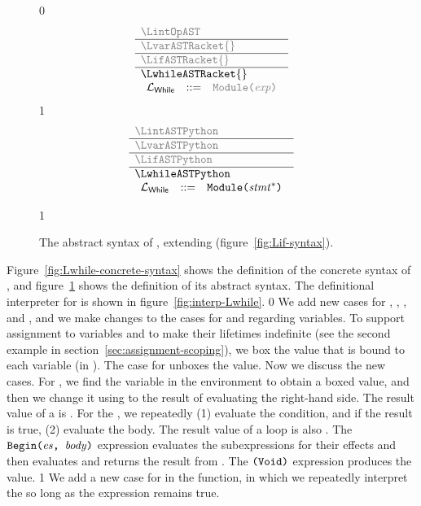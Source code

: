 \documentclass[7x10]{TimesAPriori_MIT}%
\newcommand{\gray}[1]{{\color{gray} #1}}
\def\racketEd{0}
\def\pythonEd{1}
\def\edition{1}
\newcommand{\pythonColor}[0]{}
\newcommand{\python}[1]{{\if\edition\pythonEd\pythonColor #1\fi}}
\numberwithin{theorem}{chapter}
\numberwithin{definition}{chapter}
\numberwithin{equation}{chapter}
\begin{document}
\begin{figure}[tp]
\centering
\begin{tcolorbox}[colback=white]
    \small
{\if\edition\racketEd    
\[
\begin{array}{l}
  \gray{\LintOpAST} \\ \hline
  \gray{\LvarASTRacket{}} \\ \hline
  \gray{\LifASTRacket{}} \\ \hline
  \LwhileASTRacket{} \\
\begin{array}{lcl}
  \LangLoopM{} &::=& \gray{ \PROGRAM{\code{'()}}{\Exp} }
\end{array}
\end{array}
\]
\fi}
{\if\edition\pythonEd\pythonColor
\[
\begin{array}{l}
  \gray{\LintASTPython} \\ \hline
  \gray{\LvarASTPython}  \\ \hline
  \gray{\LifASTPython} \\ \hline
  \LwhileASTPython \\
\begin{array}{lcl}
\LangLoopM{} &::=& \PROGRAM{\code{'()}}{\Stmt^{*}}
\end{array}
\end{array}
\]
\fi}
\end{tcolorbox}
\python{
  }
\caption{The abstract syntax of \LangLoop{}, extending \LangIf{} (figure~\ref{fig:Lif-syntax}).}
\label{fig:Lwhile-syntax}
\end{figure}

Figure~\ref{fig:Lwhile-concrete-syntax} shows the definition of the
concrete syntax of \LangLoop{}, and figure~\ref{fig:Lwhile-syntax}
shows the definition of its abstract syntax.
%
The definitional interpreter for \LangLoop{} is shown in
figure~\ref{fig:interp-Lwhile}.
%
{\if\edition\racketEd    
%
We add new cases for , , ,
and , and we make changes to the cases for  and
 regarding variables. To support assignment to variables and
to make their lifetimes indefinite (see the second example in
section~\ref{sec:assignment-scoping}), we box the value that is bound
to each variable (in ). The case for  unboxes the
value.
%
Now we discuss the new cases. For , we find the
variable in the environment to obtain a boxed value, and then we change
it using  to the result of evaluating the right-hand
side.  The result value of a  is .
%
For the , we repeatedly (1) evaluate the condition, and
if the result is true, (2) evaluate the body.
The result value of a  loop is also .
%
The $\texttt{Begin}\texttt{(}\mathit{es}\texttt{, }\mathit{body}\texttt{)}$ expression evaluates the
subexpressions  for their effects and then evaluates
and returns the result from .
%
The $\texttt{(Void)}{}$ expression produces the  value.
%
\fi}
{\if\edition\pythonEd\pythonColor
%
We add a new case for  in the 
function, in which we repeatedly interpret the  so long as the
 expression remains true.
%
\fi}
\end{document}
